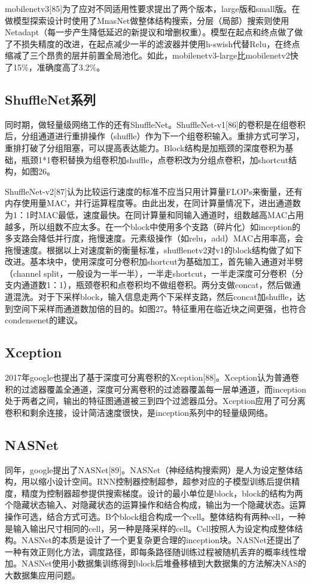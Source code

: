 \documentclass[15pt]{article}
\begin{document}
mobilenetv3[85]为了应对不同适用性要求提出了两个版本，large版和small版。在做模型探索设计时使用了MnasNet做整体结构搜索，分层（局部）搜索则使用Netadapt（每一步产生降低延迟的新提议和增删权重）。模型在起点和终点做了做了不损失精度的改进，在起点减少一半的滤波器并使用h-swish代替Relu，在终点缩减了三个昂贵的层并前置全局池化。如此，mobilenetv3-large比mobilenetv2快了15\%，准确度高了3.2\%。

\subsection{ShuffleNet系列}
同时期，做轻量级网络工作的还有ShuffleNet。ShuffleNet-v1[86]的卷积是在组卷积后，分组通道进行重排操作（shuffle）作为下一个组卷积输入。重排方式可学习，重排打破了分组阻塞，可以提高表达能力。Block结构是加瓶颈的深度卷积为基础，瓶颈1*1卷积替换为组卷积加shuffle，点卷积改为分组点卷积，加shortcut结构，如图26。

ShuffleNet-v2[87]认为比较运行速度的标准不应当只用计算量FLOPs来衡量，还有内存使用量MAC，并行运算程度等。由此出发，在同计算量情况下，进出通道数为1：1时MAC最低，速度最快。在同计算量和同输入通道时，组数越高MAC占用越多，所以组数不应太多。在一个block中使用多个支路（碎片化）如inception的多支路会降低并行度，拖慢速度。元素级操作（如relu，add）MAC占用率高，会拖慢速度。根据以上对速度新的衡量标准，shufflenetv2对v1的block结构做了如下改进。基本块中，使用深度可分卷积加shortcut为基础加工，首先输入通道对半劈（channel split，一般设为一半一半），一半走shortcut，一半走深度可分卷积（分支内通道数1：1），瓶颈卷积和点卷积均不做组卷积。两分支做concat，然后做通道混洗。对于下采样block，输入信息走两个下采样支路，然后concat加shuffle，达到空间下采样而通道数加倍的目的。如图27。特征重用在临近块之间更强，也符合condensenet的建议。

\subsection{Xception}
2017年google也提出了基于深度可分离卷积的Xception[88]。Xception认为普通卷积的过滤器覆盖全通道，深度可分离卷积的过滤器覆盖每一层单通道，而inception处于两者之间，输出的特征图通道被三到四个过滤器瓜分。Xception应用了可分离卷积和剩余连接，设计简洁速度很快，是inception系列中的轻量级网络。

\subsection{NASNet}
同年，google提出了NASNet[89]。NASNet（神经结构搜索网）是人为设定整体结构，用以缩小设计空间。RNN控制器控制超参，超参对应的子模型训练后提供精度，精度为控制器超参提供搜索梯度。设计的最小单位是block，block的结构为两个隐藏状态输入、对隐藏状态的运算操作和结合构成，输出为一个隐藏状态。运算操作可选，结合方式可选。B个block组合构成一个cell。整体结构有两种cell，一种是输入输出尺寸相同的cell，另一种是降采样的cell。Cell按照人为设定构成整体结构。NASNet的本质是设计了一个更复杂更合理的inception块。NASNet还提出了一种有效正则化方法，调度路径，即每条路径随训练过程被随机丢弃的概率线性增加。NASNet使用小数据集训练得到block后堆叠移植到大数据集的方法解决NAS的大数据集应用问题。
\end{document}
